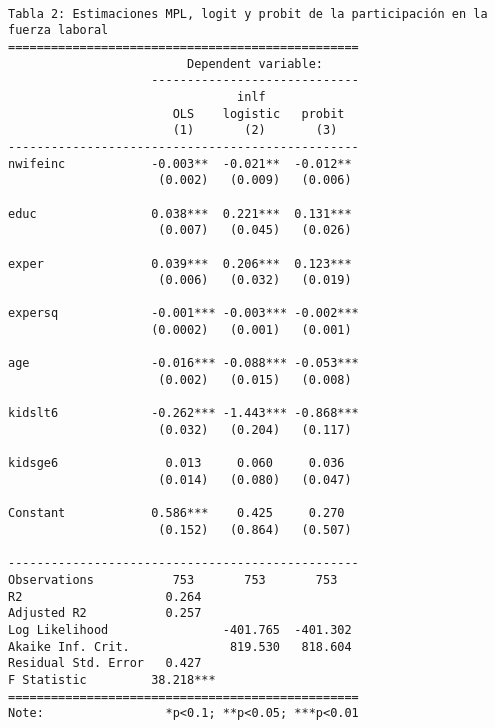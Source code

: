 \documentclass[
  letterpaper,
  DIV=11,
  numbers=noendperiod]{scrreprt}
\begin{document}
\begin{verbatim}

Tabla 2: Estimaciones MPL, logit y probit de la participación en la fuerza laboral
=================================================
                         Dependent variable:     
                    -----------------------------
                                inlf             
                       OLS    logistic   probit  
                       (1)       (2)       (3)   
-------------------------------------------------
nwifeinc            -0.003**  -0.021**  -0.012** 
                     (0.002)   (0.009)   (0.006) 
                                                 
educ                0.038***  0.221***  0.131*** 
                     (0.007)   (0.045)   (0.026) 
                                                 
exper               0.039***  0.206***  0.123*** 
                     (0.006)   (0.032)   (0.019) 
                                                 
expersq             -0.001*** -0.003*** -0.002***
                    (0.0002)   (0.001)   (0.001) 
                                                 
age                 -0.016*** -0.088*** -0.053***
                     (0.002)   (0.015)   (0.008) 
                                                 
kidslt6             -0.262*** -1.443*** -0.868***
                     (0.032)   (0.204)   (0.117) 
                                                 
kidsge6               0.013     0.060     0.036  
                     (0.014)   (0.080)   (0.047) 
                                                 
Constant            0.586***    0.425     0.270  
                     (0.152)   (0.864)   (0.507) 
                                                 
-------------------------------------------------
Observations           753       753       753   
R2                    0.264                      
Adjusted R2           0.257                      
Log Likelihood                -401.765  -401.302 
Akaike Inf. Crit.              819.530   818.604 
Residual Std. Error   0.427                      
F Statistic         38.218***                    
=================================================
Note:                 *p<0.1; **p<0.05; ***p<0.01
\end{verbatim}
\end{document}
